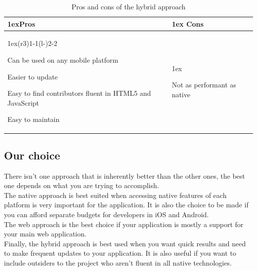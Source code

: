 \documentclass{eplmastersthesis}
\begin{document}
\begin{table}[H]
\begin{tabularx}{\linewidth}{>{\parskip1ex}X@{\kern4\tabcolsep}>{\parskip1ex}X}
\toprule
\hfil\bfseries Pros
&
\hfil\bfseries Cons
\\\cmidrule(r{3\tabcolsep}){1-1}\cmidrule(l{-\tabcolsep}){2-2}

Can be used on any mobile platform\par
Easier to update\par
Easy to find contributors fluent in HTML5 and JavaScript\par
Easy to maintain\par

&

Not as performant as native\par



\\\bottomrule
\end{tabularx}
\caption{Pros and cons of the hybrid approach}
\end{table}

\subsection{Our choice}

There isn't one approach that is inherently better than the other ones, the best one depends on what you are trying to accomplish.\\

The native approach is best suited when accessing native features of each platform is very important for the application. It is also the choice to be made if you can afford separate budgets for developers in iOS and Android.\\

The web approach is the best choice if your application is mostly a support for your main web application.\\

Finally, the hybrid approach is best used when you want quick results and need to make frequent updates to your application. It is also useful if you want to include outsiders to the project who aren't fluent in all native technologies.\\
\end{document}
